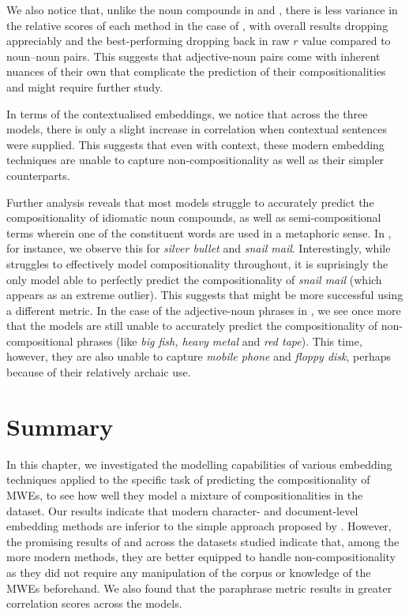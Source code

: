 We also notice that, unlike the noun compounds in \reddy and \ramisch, there is less variance in the relative scores of each method in the case of \discoj[ADJ], with overall results dropping appreciably and the best-performing \wordtovec dropping back in raw $r$ value compared to noun--noun pairs. This suggests that adjective-noun pairs come with inherent nuances of their own that complicate the prediction of their compositionalities and might require further study.

In terms of the contextualised embeddings, we notice that across the three models, there is only a slight increase in correlation when contextual sentences were supplied. This suggests that even with context, these modern embedding techniques are unable to capture non-compositionality as well as their simpler counterparts. 

Further analysis reveals that most models struggle to accurately predict the compositionality of idiomatic noun compounds, as well as semi-compositional terms wherein one of the constituent words are used in a metaphoric sense. In \reddy, for instance, we observe this for \textit{silver bullet} and \textit{snail mail}. Interestingly, while \bert struggles to effectively model compositionality throughout, it is suprisingly the only model able to perfectly predict the compositionality of \textit{snail mail} (which appears as an extreme outlier). This suggests that \bert might be more successful using a different metric. In the case of the adjective-noun phrases in \discoj, we see once more that the models are still unable to accurately predict the compositionality of non-compositional phrases (like \textit{big fish, heavy metal} and \textit{red tape}). This time, however, they are also unable to capture \textit{mobile phone} and \textit{floppy disk}, perhaps because of their relatively archaic use.

\section{Summary}
In this chapter, we investigated the modelling capabilities of various embedding techniques applied to the specific task of predicting the compositionality of MWEs, to see how well they model a mixture of compositionalities in the dataset. Our results indicate that modern character- and document-level embedding methods are inferior to the simple \wordtovec approach proposed by \cite{Salehi2015}. However, the promising results of \fasttext and \infersent across the datasets studied indicate that, among the more modern methods, they are better equipped to handle non-compositionality as they did not require any manipulation of the corpus or knowledge of the MWEs beforehand. We also found that the paraphrase metric results in greater correlation scores across the models.